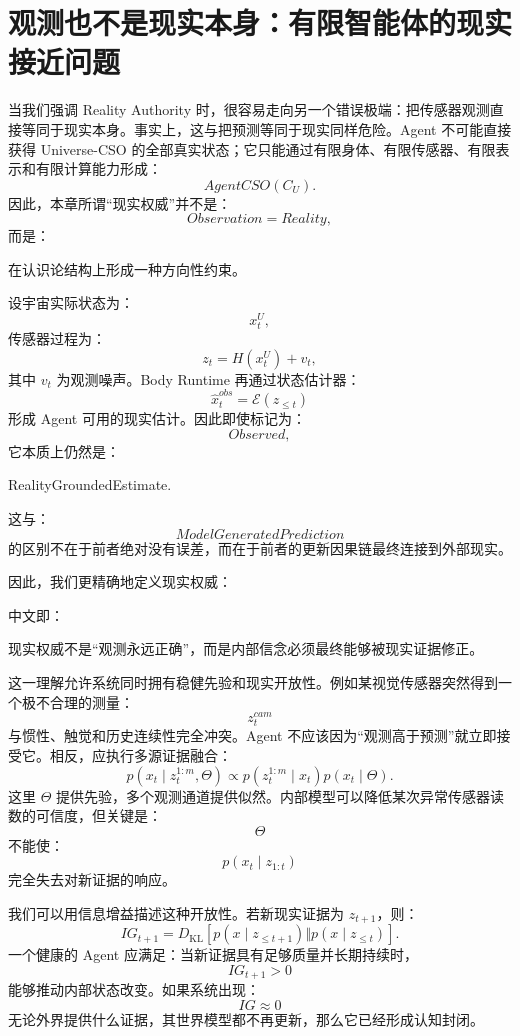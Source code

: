 \section{观测也不是现实本身：有限智能体的现实接近问题}

当我们强调 Reality Authority 时，很容易走向另一个错误极端：把传感器观测直接等同于现实本身。事实上，这与把预测等同于现实同样危险。Agent 不可能直接获得 Universe-CSO 的全部真实状态；它只能通过有限身体、有限传感器、有限表示和有限计算能力形成：
\[
AgentCSO(C_U).
\]
因此，本章所谓``现实权威''并不是：
\[
Observation=Reality,
\]
而是：
\begin{statementbox}
\centering
{}
\end{statementbox}
在认识论结构上形成一种方向性约束。

设宇宙实际状态为：
\[
x_t^U,
\]
传感器过程为：
\[
z_t
=
H(x_t^U)+v_t,
\]
其中 $v_t$ 为观测噪声。Body Runtime 再通过状态估计器：
\[
\hat{x}^{obs}_t
=
\mathcal E(z_{\leq t})
\]
形成 Agent 可用的现实估计。因此即使标记为：
\[
Observed,
\]
它本质上仍然是：
\begin{statementbox}
RealityGroundedEstimate.
\end{statementbox}
这与：
\[
ModelGeneratedPrediction
\]
的区别不在于前者绝对没有误差，而在于前者的更新因果链最终连接到外部现实。

因此，我们更精确地定义现实权威：
\begin{statementbox}
\centering
{}
\end{statementbox}
中文即：

\begin{statementbox}
现实权威不是“观测永远正确”，而是内部信念必须最终能够被现实证据修正。
\end{statementbox}

这一理解允许系统同时拥有稳健先验和现实开放性。例如某视觉传感器突然得到一个极不合理的测量：
\[
z_t^{cam}
\]
与惯性、触觉和历史连续性完全冲突。Agent 不应该因为``观测高于预测''就立即接受它。相反，应执行多源证据融合：
\[
p(x_t\mid z_t^{1:m},\Theta)
\propto
p(z_t^{1:m}\mid x_t)p(x_t\mid\Theta).
\]
这里 $\Theta$ 提供先验，多个观测通道提供似然。内部模型可以降低某次异常传感器读数的可信度，但关键是：
\[
\Theta
\]
不能使：
\[
p(x_t\mid z_{1:t})
\]
完全失去对新证据的响应。

我们可以用信息增益描述这种开放性。若新现实证据为 $z_{t+1}$，则：
\[
IG_{t+1}
=
D_{\mathrm{KL}}
\left[
p(x\mid z_{\leq t+1})
\Vert
p(x\mid z_{\leq t})
\right].
\]
一个健康的 Agent 应满足：当新证据具有足够质量并长期持续时，
\[
IG_{t+1}>0
\]
能够推动内部状态改变。如果系统出现：
\[
IG\approx0
\]
无论外界提供什么证据，其世界模型都不再更新，那么它已经形成认知封闭。


